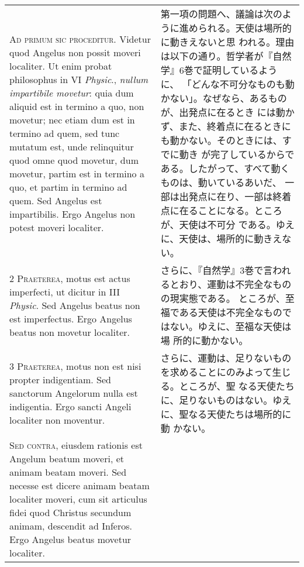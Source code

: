\documentclass[10pt]{jsarticle} %
\begin{document}
\begin{longtable}{p{21em}p{21em}}

{\huge A}{\scshape d primum sic proceditur}. Videtur quod Angelus non
possit moveri localiter. Ut enim probat philosophus in VI {\itshape
Physic}., {\itshape nullum impartibile movetur}: quia dum aliquid est in
termino a quo, non movetur; nec etiam dum est in termino ad quem, sed
tunc mutatum est, unde relinquitur quod omne quod movetur, dum movetur,
partim est in termino a quo, et partim in termino ad quem. Sed Angelus
est impartibilis. Ergo Angelus non potest moveri localiter.

&

第一項の問題へ、議論は次のように進められる。天使は場所的に動きえないと思
 われる。理由は以下の通り。哲学者が『自然学』6巻で証明しているように、
 「どんな不可分なものも動かない」。なぜなら、あるものが、出発点に在るとき
 には動かず、また、終着点に在るときにも動かない。そのときには、すでに動き
 が完了しているからである。したがって、すべて動くものは、動いているあいだ、
 一部は出発点に在り、一部は終着点に在ることになる。ところが、天使は不可分
 である。ゆえに、天使は、場所的に動きえない。

\\


2 {\scshape Praeterea}, motus est actus imperfecti, ut dicitur in III
{\itshape Physic}. Sed Angelus beatus non est imperfectus. Ergo Angelus
beatus non movetur localiter.

&
さらに、『自然学』3巻で言われるとおり、運動は不完全なものの現実態である。
 ところが、至福である天使は不完全なものではない。ゆえに、至福な天使は場
 所的に動かない。

\\


3 {\scshape Praeterea}, motus non est nisi propter
indigentiam. Sed sanctorum Angelorum nulla est indigentia. Ergo sancti
Angeli localiter non moventur.

&
さらに、運動は、足りないものを求めることにのみよって生じる。ところが、聖
 なる天使たちに、足りないものはない。ゆえに、聖なる天使たちは場所的に動
 かない。

\\


{\scshape Sed contra}, eiusdem rationis est Angelum
beatum moveri, et animam beatam moveri. Sed necesse est dicere animam
beatam localiter moveri, cum sit articulus fidei quod Christus secundum
animam, descendit ad Inferos. Ergo Angelus beatus movetur localiter.


&


\end{longtable}
\end{document}
